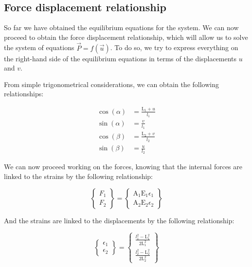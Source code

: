 \subsection{Force displacement relationship}
\label{subsec:force_displacement_relationship}

So far we have obtained the equilibrium equations for the system.
We can now proceed to obtain the force displacement relationship, which will allow us to solve the system of equations ${\vec{P}} = f({\vec{u}})$.
To do so, we try to express everything on the right-hand side of the equilibrium equations in terms of the displacements $u$ and $v$.

From simple trigonometrical considerations, we can obtain the following relationships:

\begin{align}
    \cos(\alpha) & = \frac{\text{L}_1+u}{l_1} \\
    \sin(\alpha) & = \frac{v}{l_1}            \\
    \cos(\beta)  & = \frac{\text{L}_2+v}{l_2} \\
    \sin(\beta)  & = \frac{u}{l_2}
    \label{eq:trigonometrical_relationships}
\end{align}

We can now proceed working on the forces, knowing that the internal forces are linked to the strains by the following relationship:

\begin{equation}
    \begin{Bmatrix}
        F_1 \\
        F_2
    \end{Bmatrix}
    =
    \begin{Bmatrix}
        \text{A}_1 \text{E}_1 \epsilon_1 \\
        \text{A}_2 \text{E}_2 \epsilon_2
    \end{Bmatrix}
    \label{eq:internal_forces_strains_relationship}
\end{equation}

And the strains are linked to the displacements by the following relationship:

\begin{equation}
    \begin{Bmatrix}
        \epsilon_1 \\
        \epsilon_2
    \end{Bmatrix}
    =
    \begin{Bmatrix}
        \frac{l_1^2-\text{L}_1^2}{2 \text{L}_1^2} \\
        \frac{l_2^2-\text{L}_2^2}{2 \text{L}_2^2}
    \end{Bmatrix}
    \label{eq:strains_displacements_relationship}
\end{equation}

